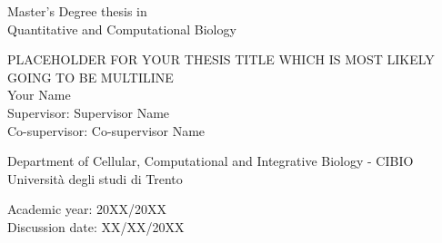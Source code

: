 \graphicspath{{chapters/00_title_page/}}

\pagestyle{empty}

\begin{center}

  \begin{figure}[h!]
    \centerline{}
  \end{figure}
  
  \vspace{1 cm}

  \Large{Master's Degree thesis in\\Quantitative and Computational Biology\\}  
  \vspace{1 cm}

  \LARGE\textsc{PLACEHOLDER FOR YOUR THESIS TITLE WHICH IS MOST LIKELY GOING TO BE MULTILINE\\}
  \vspace{0.5 cm}
  \LARGE{Your Name\\}
  \vspace{0.5 cm}
  \Large{Supervisor: Supervisor Name\\}
  \Large{Co-supervisor: Co-supervisor Name\\}

  \vspace{2 cm} 
  \Large{Department of Cellular, Computational and Integrative Biology - CIBIO\\}
  \Large{Università degli studi di Trento}
  \vspace{0.5 cm}
  

  \Large{Academic year: 20XX/20XX}\\
  \Large{Discussion date: XX/XX/20XX}
  
\end{center}

\maketitle
